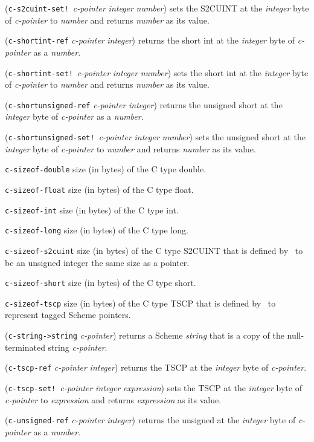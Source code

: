 \documentclass[10pt,twocolumn]{article}
\begin{document}
(\texttt{c-s2cuint-set!}\ \emph{c-pointer} \emph{integer}
\emph{number}) sets the S2CUINT at the \emph{integer} byte of
\emph{c-pointer} to \emph{number} and returns \emph{number} as its
value.

(\texttt{c-shortint-ref} \emph{c-pointer} \emph{integer}) returns the
short int at the \emph{integer} byte of \emph{c-pointer} as a
\emph{number}.

(\texttt{c-shortint-set!}\ \emph{c-pointer} \emph{integer}
\emph{number}) sets the short int at the \emph{integer} byte of
\emph{c-pointer} to \emph{number} and returns \emph{number} as its
value.

(\texttt{c-shortunsigned-ref} \emph{c-pointer} \emph{integer}) returns
the unsigned short at the \emph{integer} byte of \emph{c-pointer} as a
\emph{number}.

(\texttt{c-shortunsigned-set!}\ \emph{c-pointer} \emph{integer}
\emph{number}) sets the unsigned short at the \emph{integer} byte of
\emph{c-pointer} to \emph{number} and returns \emph{number} as its
value.

\texttt{c-sizeof-double} size (in bytes) of the C type double.

\texttt{c-sizeof-float} size (in bytes) of the C type float.

\texttt{c-sizeof-int} size (in bytes) of the C type int.

\texttt{c-sizeof-long} size (in bytes) of the C type long.

\texttt{c-sizeof-s2cuint} size (in bytes) of the C type S2CUINT that
is defined by \StoC\ to be an unsigned integer the same size as a
pointer.

\texttt{c-sizeof-short} size (in bytes) of the C type short.

\texttt{c-sizeof-tscp} size (in bytes) of the C type TSCP that is
defined by \StoC\ to represent tagged Scheme pointers.

(\texttt{c-string->string} \emph{c-pointer}) returns a Scheme
\emph{string} that is a copy of the null-terminated string
\emph{c-pointer}.

(\texttt{c-tscp-ref} \emph{c-pointer} \emph{integer}) returns the TSCP
at the \emph{integer} byte of \emph{c-pointer}.

(\texttt{c-tscp-set!}\ \emph{c-pointer} \emph{integer}
\emph{expression}) sets the TSCP at the \emph{integer} byte of
\emph{c-pointer} to \emph{expression} and returns \emph{expression} as
its value.

(\texttt{c-unsigned-ref} \emph{c-pointer} \emph{integer}) returns the
unsigned at the \emph{integer} byte of \emph{c-pointer} as a
\emph{number}.
\end{document}
